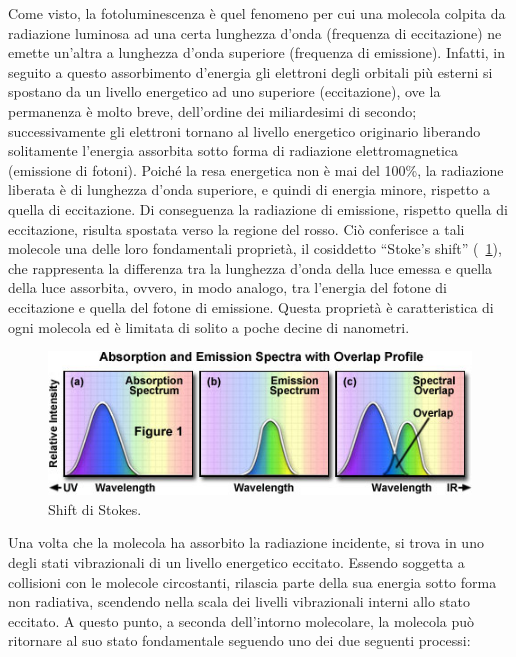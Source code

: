 Come visto, la fotoluminescenza è quel fenomeno per cui una molecola colpita da radiazione luminosa ad una certa lunghezza d'onda (frequenza di eccitazione) ne emette un'altra a lunghezza d'onda superiore (frequenza di emissione). 
Infatti, in seguito a questo assorbimento d'energia gli elettroni degli orbitali più esterni si spostano da un livello energetico ad uno superiore (eccitazione), ove la permanenza è molto breve, dell'ordine dei miliardesimi di secondo; successivamente gli elettroni tornano al livello energetico originario liberando solitamente l'energia assorbita sotto forma di radiazione elettromagnetica (emissione di fotoni). 
Poiché la resa energetica non è mai del 100\%, la radiazione liberata è di lunghezza d'onda superiore, e quindi di energia minore, rispetto a quella di eccitazione. 
Di conseguenza la radiazione di emissione, rispetto quella di eccitazione, risulta spostata verso la regione del rosso. 
Ciò conferisce a tali molecole una delle loro fondamentali proprietà, il cosiddetto ``Stoke's shift'' (\figurename~\ref{fig:stokes}), che rappresenta la differenza tra la lunghezza d'onda della luce emessa e quella della luce assorbita, ovvero, in modo analogo, tra l'energia del fotone di eccitazione e quella del fotone di emissione.
Questa proprietà è caratteristica di ogni molecola ed è limitata di solito a poche decine di nanometri.

\begin{figure}[!h]
 \centering
\includegraphics[scale=0.70]{img/CAP1stokes.jpg}
 \caption{ \small{Shift di Stokes.} }
 \label{fig:stokes}
\end{figure}

Una volta che la molecola ha assorbito la radiazione incidente, si trova in uno degli stati vibrazionali di un livello energetico eccitato. 
Essendo soggetta a collisioni con le molecole circostanti, rilascia parte della sua energia sotto forma non radiativa, scendendo nella scala dei livelli vibrazionali interni allo stato eccitato. 
A questo punto, a seconda dell'intorno molecolare, la molecola può ritornare al suo stato fondamentale seguendo uno dei due seguenti processi:

